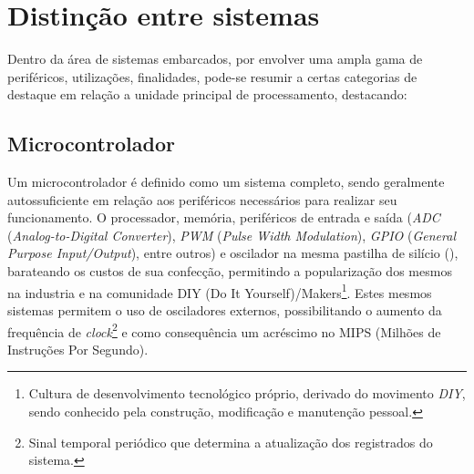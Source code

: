 \section{Distinção entre sistemas}
Dentro da área de sistemas embarcados, por envolver uma ampla gama de periféricos, utilizações, finalidades, pode-se resumir a certas categorias de destaque em relação a unidade principal de processamento, destacando:

\subsection{Microcontrolador}

Um microcontrolador é definido como um sistema completo, sendo geralmente autossuficiente em relação aos periféricos necessários para realizar seu funcionamento. O processador, memória, periféricos de entrada e saída (\textit{ADC} (\textit{Analog-to-Digital Converter}), \textit{PWM} (\textit{Pulse Width Modulation}), \textit{GPIO} (\textit{General Purpose Input/Output}), entre outros) e oscilador na mesma pastilha de silício (), barateando os custos de sua confecção, permitindo a popularização dos mesmos na industria e na comunidade DIY (Do It Yourself)/Makers\footnote{Cultura de desenvolvimento tecnológico próprio, derivado do movimento \textit{DIY}, sendo conhecido pela construção, modificação e manutenção pessoal.}. Estes mesmos
sistemas permitem o uso de osciladores externos, possibilitando o aumento da frequência de \textit{clock}\footnote{Sinal temporal periódico que determina a atualização dos registrados do sistema.} e como consequência um acréscimo no MIPS (Milhões de Instruções Por Segundo).

